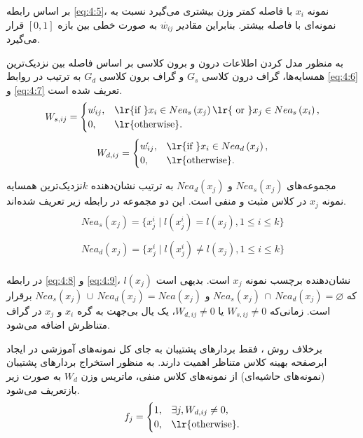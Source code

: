 بر اساس رابطه \ref{eq:4:5}، نمونه  $x_{i}$ با فاصله کمتر وزن بیشتری می‌گیرد نسبت به نمونه‌ای با فاصله بیشتر. بنابراین مقادیر $\acute{w_{ij}}$  به صورت خطی بین بازه $\left[0,1\right]$ قرار می‌گیرد.

به منظور مدل کردن اطلاعات درون و برون کلاسی بر اساس فاصله بین نزدیک‌ترین همسایه‌ها، گراف درون کلاسی $G_{s}$ و گراف برون کلاسی $G_{d}$ به ترتیب در روابط \ref{eq:4:6} و \ref{eq:4:7} تعریف شده است.
\begin{equation}\label{eq:4:6}
W_{s,ij} =
\begin{cases}
\acute{w_{ij}}, & \textrm{\lr{if }} x_{i} \in Nea_{s}\left(x_{j}\right) \textrm{\lr{ or }} x_j \in Nea_{s}\left(x_i\right), \\
0, & \textrm{\lr{otherwise}}.
\end{cases}
\end{equation}
\begin{equation}\label{eq:4:7}
W_{d,ij} =
\begin{cases}
\acute{w_{ij}}, & \textrm{\lr{if }} x_{i} \in Nea_{d}\left(x_{j}\right), \\
0, & \textrm{\lr{otherwise}}.
\end{cases}
\end{equation}

مجموعه‌های $Nea_{s}\left(x_{j}\right)$ و $Nea_{d}\left(x_{j}\right)$ به ترتیب نشان‌دهنده  $k$نزدیک‌ترین همسایه نمونه $x_{j}$  در کلاس مثبت و منفی است. این دو مجموعه در رابطه زیر تعریف شده‌اند.
\begin{align}
\label{eq:4:8}
\begin{split}
Nea_{s}\left(x_j\right) = \{x^{i}_{j} \mid l(x^{i}_{j}) = l(x_{j}), 1 \leq i \leq k \}
\end{split}\\
\label{eq:4:9}
\begin{split}
Nea_{d}\left(x_j\right) = \{x^{i}_{j} \mid l(x^{i}_{j}) \neq l(x_{j}), 1 \leq i \leq k \}
\end{split}
\end{align}

در رابطه \ref{eq:4:8} و \ref{eq:4:9}، $l(x_{j})$  نشان‌دهنده برچسب نمونه $x_{j}$ است. بدیهی است که  $Nea_{s}(x_j)\,\cap\, Nea_{d}(x_j)= \varnothing$ و $Nea_{s}(x_j)\, \cup \, Nea_{d}(x_j) = Nea(x_j)$  برقرار است. زمانی‌که  $W_{s,ij} \neq 0$ یا  $W_{d,ij} \neq 0$، یک یال بی‌جهت به گره $x_{i}$ و $x_{j}$  در گراف متناظرش اضافه می‌شود.

برخلاف روش ، فقط بردار‌های پشتیبان به جای کل نمونه‌های آموزشی در ایجاد ابرصفحه بهینه کلاس متناظر اهمیت دارند. به منظور استخراج بردار‌های پشتیبان (نمونه‌های حاشیه‌ای) از نمونه‌های کلاس منفی، ماتریس وزن  $W_{d}$ به صورت زیر بازتعریف می‌شود.
\begin{equation}\label{eq:4:10}
f_{j} =
\begin{cases}
1, & \exists j, W_{d,ij} \neq 0,  \\
0, & \textrm{\lr{otherwise}}.
\end{cases}
\end{equation}

